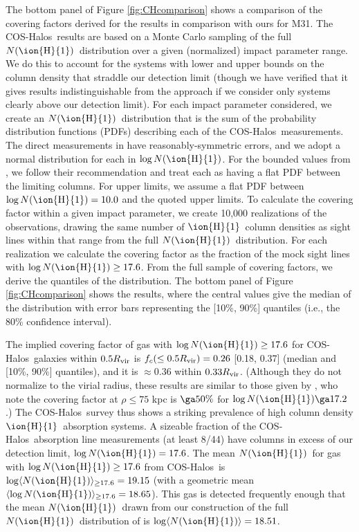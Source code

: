 \documentclass[12pt,preprint]{aastex6}
\newcommand{\HI}{\ensuremath{\mbox{\ion{H}{1}}}}
\newcommand{\NHI}{\ensuremath{N(\mbox{\ion{H}{1}})}\relax}
\newcommand{\logNHI}{\ensuremath{\log N(\mbox{\ion{H}{1}})}\relax}
\newcommand{\Rvir}{\ensuremath{R_{\rm vir}}\relax}
\newcommand{\coshalos}{COS-Halos}
\begin{document}
The bottom panel of Figure \ref{fig:CHcomparison} shows a comparison
of the covering factors derived for the \citet{prochaska2017} results
in comparison with ours for M31. The \coshalos\ results are based on a
Monte Carlo sampling of the full \NHI\ distribution over a given
(normalized) impact parameter range. We do this to account for the
systems with lower and upper bounds on the column density that
straddle our detection limit (though we have verified that it gives
results indistinguishable from the \citealt{cameron2011} approach if
we consider only systems clearly above our detection limit). For each
impact parameter considered, we create an \NHI\ distribution that is
the sum of the probability distribution functions (PDFs) describing
each of the \coshalos\ measurements. The direct measurements in
\citet{prochaska2017} have reasonably-symmetric errors, and we adopt a
normal distribution for each in \logNHI. For the bounded values from
\citeauthor{prochaska2017}, we follow their recommendation and treat
each as having a flat PDF between the limiting columns. For upper
limits, we assume a flat PDF between $\logNHI = 10.0$ and the quoted
upper limits. To calculate the covering factor within a given impact
parameter, we create 10,000 realizations of the observations, drawing
the same number of \HI\ column densities as sight lines within that
range from the full \NHI\ distribution. For each realization we
calculate the covering factor as the fraction of the mock sight lines
with $\logNHI \ge 17.6$. From the full sample of covering factors, we
derive the quantiles of the distribution. The bottom panel of Figure
\ref{fig:CHcomparison} shows the results, where the central values
give the median of the distribution with error bars representing the
[10\%, 90\%] quantiles (i.e., the 80\% confidence interval).

The implied covering factor of gas with $\logNHI \ge 17.6$ for
\coshalos\ galaxies within $0.5 \Rvir$ is $f_c(\le 0.5 \Rvir) = 0.26$
[0.18, 0.37] (median and [10\%, 90\%] quantiles), and it is
$\approx0.36$ within $0.33 \Rvir$. (Although they do not normalize to
the virial radius, these results are similar to those given by
\citet{prochaska2017}, who note the covering factor at $\rho \le 75$
kpc is $\ga 50\%$ for $\log \NHI \ga 17.2$.)  The \coshalos\ survey
thus shows a striking prevalence of high column density \HI\
absorption systems. A sizeable fraction of the \coshalos\ absorption
line measurements (at least 8/44) have columns in excess of our
detection limit, $\logNHI = 17.6$. The mean \NHI\ for gas with
$\logNHI \ge 17.6$ from \coshalos\ is
$\log \langle \NHI \rangle_{\ge17.6} = 19.15$ (with a geometric mean
$\langle \log \NHI \rangle_{\ge17.6} = 18.65$). This gas is detected
frequently enough that the mean \NHI\ drawn from our construction of
the full \NHI\ distribution of \citet{prochaska2017} is
$\log \langle \NHI \rangle = 18.51$.
\end{document}
